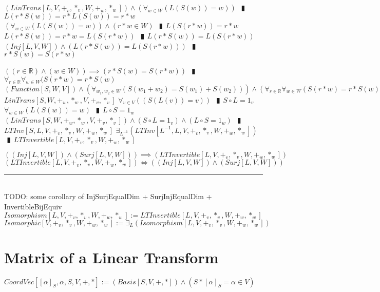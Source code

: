 \documentclass{book}
\newcommand{\abr}{:=}
\newcommand{\pipe}{$\phantom{(}\vrectangleblack\phantom{)}$}
\begin{document}
\begin{enumerate}
\begin{enumerate}
    \begin{enumerate}
      \lit $(LinTrans[L, V, +_v, *_v, W, +_w, *_w]) \land (\forall_{w \in W}(L(S(w)) = w))$ \pipe $L(r * S(w)) = r * L(S(w)) = r * w$
      \lit $(\forall_{w \in W}(L(S(w)) = w)) \land (r * w \in W)$ \pipe $L(S(r * w)) = r * w$
      \lit $L(r * S(w)) = r * w = L(S(r * w))$ \pipe $L(r * S(w)) = L(S(r * w))$
      \lit $(Inj[L, V, W]) \land (L(r * S(w)) = L(S(r * w)))$ \pipe $r * S(w) = S(r * w)$
    \end{enumerate}
    \lit $((r \in \mathbb{R}) \land (w \in W)) \implies (r * S(w) = S(r * w))$ \pipe $\forall_{r \in \mathbb{R}} \forall_{w \in W}(S(r * w) = r * S(w)$
    \lit $(Function[S, W, V]) \land (\forall_{w_1, w_2 \in W}(S(w_1 + w_2) = S(w_1) + S(w_2))) \land (\forall_{r \in \mathbb{R}} \forall_{w \in W}(S(r * w) = r * S(w)))$
    \lit $LinTrans[S, W, +_w, *_w, V, +_v, *_v]$
    \lit $\forall_{v \in V}((S(L(v)) = v))$ \pipe $S \circ L = 1_v$
    \lit $\forall_{w \in W}(L(S(w)) = w)$ \pipe $L \circ S = 1_w$
    \lit $(LinTrans[S, W, +_w, *_w, V, +_v, *_v]) \land (S \circ L = 1_v) \land (L \circ S = 1_w)$ \pipe $LTInv[S, L, V, +_v, *_v, W, +_w, *_w]$
    \lit $\exists_{L^{-1}}(LTInv[L^{-1}, L, V, +_v, *_v, W, +_w, *_w])$ \pipe $LTInvertible[L, V, +_v, *_v, W, +_w, *_w]$
  \end{enumerate}
  \lit $((Inj[L, V, W]) \land (Surj[L, V, W])) \implies (LTInvertible[L, V, +_v, *_v, W, +_w, *_w])$
  \lit $(LTInvertible[L, V, +_v, *_v, W, +_w, *_w]) \iff ((Inj[L, V, W]) \land (Surj[L, V, W]))$
\end{enumerate} \vspace{.75mm} \hrule \vspace{.75mm} \ \\ 

TODO: some corollary of InjSurjEqualDim + SurjInjEqualDim + InvertibleBijEquiv \\

$Isomorphism[L, V, +_v, *_v, W, +_w, *_w] \abr LTInvertible[L, V, +_v, *_v, W, +_w, *_w]$ \\
$Isomorphic[V, +_v, *_v, W, +_w, *_w] \abr \exists_{L}(Isomorphism[L, V, +_v, *_v, W, +_w, *_w])$ \\


\section{Matrix of a Linear Transform}
$CoordVec[[\alpha]_S, \alpha, S, V, +, *] \abr (Basis[S, V, +, *]) \land (S * [\alpha]_S = \alpha \in V)$ \\
\end{document}
